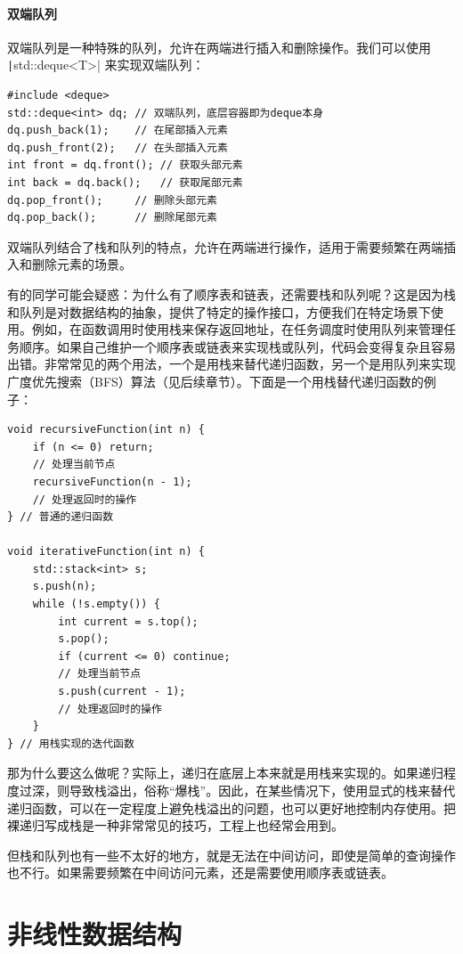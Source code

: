 \paragraph{双端队列}

双端队列是一种特殊的队列，允许在两端进行插入和删除操作。我们可以使用 \texttt|std::deque<T>| 来实现双端队列：
\begin{verbatim}
#include <deque>
std::deque<int> dq; // 双端队列，底层容器即为deque本身
dq.push_back(1);    // 在尾部插入元素
dq.push_front(2);   // 在头部插入元素
int front = dq.front(); // 获取头部元素
int back = dq.back();   // 获取尾部元素
dq.pop_front();     // 删除头部元素
dq.pop_back();      // 删除尾部元素
\end{verbatim}
双端队列结合了栈和队列的特点，允许在两端进行操作，适用于需要频繁在两端插入和删除元素的场景。

有的同学可能会疑惑：为什么有了顺序表和链表，还需要栈和队列呢？这是因为栈和队列是对数据结构的抽象，提供了特定的操作接口，方便我们在特定场景下使用。例如，在函数调用时使用栈来保存返回地址，在任务调度时使用队列来管理任务顺序。如果自己维护一个顺序表或链表来实现栈或队列，代码会变得复杂且容易出错。非常常见的两个用法，一个是用栈来替代递归函数，另一个是用队列来实现广度优先搜索（BFS）算法（见后续章节）。下面是一个用栈替代递归函数的例子：
\begin{verbatim}
void recursiveFunction(int n) {
    if (n <= 0) return;
    // 处理当前节点
    recursiveFunction(n - 1);
    // 处理返回时的操作
} // 普通的递归函数

void iterativeFunction(int n) {
    std::stack<int> s;
    s.push(n);
    while (!s.empty()) {
        int current = s.top();
        s.pop();
        if (current <= 0) continue;
        // 处理当前节点
        s.push(current - 1);
        // 处理返回时的操作
    }
} // 用栈实现的迭代函数
\end{verbatim}
那为什么要这么做呢？实际上，递归在底层上本来就是用栈来实现的。如果递归程度过深，则导致栈溢出，俗称“爆栈”。因此，在某些情况下，使用显式的栈来替代递归函数，可以在一定程度上避免栈溢出的问题，也可以更好地控制内存使用。把裸递归写成栈是一种非常常见的技巧，工程上也经常会用到。

但栈和队列也有一些不太好的地方，就是无法在中间访问，即使是简单的查询操作也不行。如果需要频繁在中间访问元素，还是需要使用顺序表或链表。

\section{非线性数据结构}

